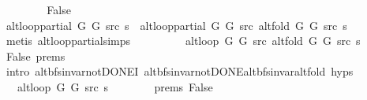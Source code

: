 \begin{isabellebody}
\ \ \isamarkupfalse%
\isanewline
\ \ \ \ \isamarkupfalse%
\ False\isanewline
\ \ \ \ \isamarkupfalse%
\ {\isachardoublequoteopen}alt{\isacharunderscore}{\kern0pt}loop{\isacharunderscore}{\kern0pt}partial\ G{}\ G{}\ src\ s\ {\isacharequal}{\kern0pt}\ alt{\isacharunderscore}{\kern0pt}loop{\isacharunderscore}{\kern0pt}partial\ G{}\ G{}\ src\ {\isacharparenleft}{\kern0pt}alt{\isacharunderscore}{\kern0pt}fold\ G{}\ G{}\ src\ s{\isacharparenright}{\kern0pt}{\isachardoublequoteclose}\isanewline
\ \ \ \ \ \ \isamarkupfalse%
\ {\isacharparenleft}{\kern0pt}metis\ alt{\isacharunderscore}{\kern0pt}loop{\isacharunderscore}{\kern0pt}partial{\isachardot}{\kern0pt}simps{\isacharparenright}{\kern0pt}\isanewline
\ \ \ \ \isamarkupfalse%
\ \isamarkupfalse%
\ {\isachardoublequoteopen}{\isachardot}{\kern0pt}{\isachardot}{\kern0pt}{\isachardot}{\kern0pt}\ {\isacharequal}{\kern0pt}\ alt{\isacharunderscore}{\kern0pt}loop\ G{}\ G{}\ src\ {\isacharparenleft}{\kern0pt}alt{\isacharunderscore}{\kern0pt}fold\ G{}\ G{}\ src\ s{\isacharparenright}{\kern0pt}{\isachardoublequoteclose}\isanewline
\ \ \ \ \ \ \isamarkupfalse%
\ False\ {\isachardoublequoteopen}{}{\isachardot}{\kern0pt}prems{\isachardoublequoteclose}\isanewline
\ \ \ \ \ \ \isamarkupfalse%
\ {\isacharparenleft}{\kern0pt}intro\ alt{\isacharunderscore}{\kern0pt}bfs{\isacharunderscore}{\kern0pt}invar{\isacharunderscore}{\kern0pt}not{\isacharunderscore}{\kern0pt}DONE{\isacharprime}{\kern0pt}I\ alt{\isacharunderscore}{\kern0pt}bfs{\isacharunderscore}{\kern0pt}invar{\isacharunderscore}{\kern0pt}not{\isacharunderscore}{\kern0pt}DONE{\isachardot}{\kern0pt}alt{\isacharunderscore}{\kern0pt}bfs{\isacharunderscore}{\kern0pt}invar{\isacharunderscore}{\kern0pt}alt{\isacharunderscore}{\kern0pt}fold\ {\isachardoublequoteopen}{}{\isachardot}{\kern0pt}hyps{\isachardoublequoteclose}{\isacharparenright}{\kern0pt}\isanewline
\ \ \ \ \isamarkupfalse%
\ \isamarkupfalse%
\ {\isachardoublequoteopen}{\isachardot}{\kern0pt}{\isachardot}{\kern0pt}{\isachardot}{\kern0pt}\ {\isacharequal}{\kern0pt}\ alt{\isacharunderscore}{\kern0pt}loop\ G{}\ G{}\ src\ s{\isachardoublequoteclose}\isanewline
\ \ \ \ \ \ \isamarkupfalse%
\ {\isachardoublequoteopen}{}{\isachardot}{\kern0pt}prems{\isachardoublequoteclose}\ False\isanewline

\end{isabellebody}
